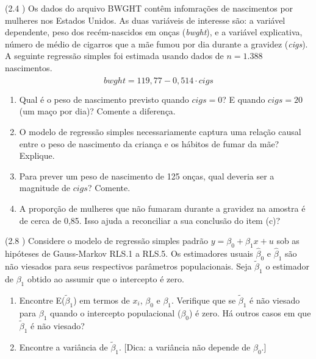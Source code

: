 \documentclass[12pt,letterpaper, onecolumn]{exam}
\begin{document}
\begin{questions}

    \question (2.4 \citep{wooldridge2016}) Os dados do arquivo BWGHT contêm infomrações de nascimentos por mulheres nos Estados Unidos. As duas variáveis de interesse são: a variável dependente, peso dos recém-nascidos em onças (\textit{bwght}), e a variável explicativa, número de médio de cigarros que a mãe fumou por dia durante a gravidez (\textit{cigs}). A seguinte regressão simples foi estimada usando dados de $n = 1.388$ nascimentos.\begin{equation*}
        \widehat{bwght} = 119,77 - 0,514 \cdot cigs
    \end{equation*}
    \begin{enumerate}[label=(\alph*)]
    \item Qual é o peso de nascimento previsto quando $cigs = 0$? E quando $cigs = 20$ (um maço por dia)? Comente a diferença.
    \item O modelo de regressão simples necessariamente captura uma relação causal entre o peso de nascimento da criança e os hábitos de fumar da mãe? Explique.
    \item Para prever um peso de nascimento de 125 onças, qual deveria ser a magnitude de $cigs$? Comente.
    \item A proporção de mulheres que não fumaram durante a gravidez na amostra é de cerca de 0,85. Isso ajuda a reconciliar a sua conclusão do item (c)?
    \end{enumerate}


    
    \question (2.8 \citep{wooldridge2016}) Considere o modelo de regressão simples padrão $y = \beta_0 + \beta_1x + u$ sob as hipóteses de Gauss-Markov RLS.1 a RLS.5. Os estimadores usuais $\hat{\beta}_0$ e $\hat{\beta}_1$ são não viesados para seus respectivos parâmetros populacionais. Seja $\tilde{\beta}_1$ o estimador de $\beta_1$ obtido ao assumir que o intercepto é zero.
    \begin{enumerate}[label=(\alph*)]
    \item Encontre E($\tilde{\beta}_1$) em termos de $x_i$, $\beta_0$ e $\beta_1$. Verifique que se $\tilde \beta_1$ é não viesado para $\beta_1$ quando o intercepto populacional ($\beta_0$) é zero. Há outros casos em que $\tilde \beta_1$ é não viesado?

    \item Encontre a variância de $\tilde \beta_1$. [Dica: a variância não depende de $\beta_0$.]


\end{enumerate}
\end{questions}
\end{document}
